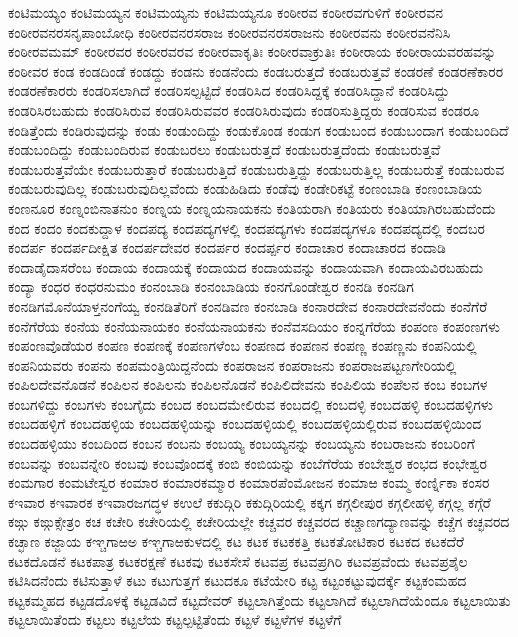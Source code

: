 {ಕಂಟಿಮಯ್ಯಂ
ಕಂಟಿಮಯ್ಯನ
ಕಂಟಿಮಯ್ಯನು
ಕಂಟಿಮಯ್ಯನೂ
ಕಂಠೀರವ
ಕಂಠೀರವಗುಳಿಗೆ
ಕಂಠೀರವನ
ಕಂಠೀರವನರಸನೃಪಾಂಬೋಧಿ
ಕಂಠೀರವನರಸರಾಜ
ಕಂಠೀರವನರಸರಾಜನು
ಕಂಠೀರವನು
ಕಂಠೀರವನೆನಿಸಿ
ಕಂಠೀರವಮಮ್
ಕಂಠೀರವರ
ಕಂಠೀರವರವ
ಕಂಠೀರವಾಕೃತಿಃ
ಕಂಠೀರವಾಕ್ರುತಿಃ
ಕಂಠೀರಾಯ
ಕಂಠೀರಾಯವರಹವನ್ನು
ಕಂಠೀವರ
ಕಂಡ
ಕಂಡದಿಂಡೆ
ಕಂಡದ್ದು
ಕಂಡನು
ಕಂಡನೆಂದು
ಕಂಡಬರುತ್ತದೆ
ಕಂಡಬರುತ್ತವೆ
ಕಂಡರಣೆ
ಕಂಡರಣೆಕಾರರ
ಕಂಡರಣೆಕಾರರು
ಕಂಡರಿಸಲಾಗಿದೆ
ಕಂಡರಿಸಲ್ಪಟ್ಟಿದೆ
ಕಂಡರಿಸಿದ
ಕಂಡರಿಸಿದ್ದಕ್ಕೆ
ಕಂಡರಿಸಿದ್ದಾನೆ
ಕಂಡರಿಸಿದ್ದು
ಕಂಡರಿಸಿರಬಹುದು
ಕಂಡರಿಸಿರುವ
ಕಂಡರಿಸಿರುವವರ
ಕಂಡರಿಸಿರುವುದು
ಕಂಡರಿಸುತ್ತಿದ್ದರು
ಕಂಡರಿಸುವ
ಕಂಡರೂ
ಕಂಡಿತ್ತೆಂದು
ಕಂಡಿರುವುದನ್ನು
ಕಂಡು
ಕಂಡುಂದಿದ್ದು
ಕಂಡುಕೊಂಡ
ಕಂಡುಗ
ಕಂಡುಬಂದ
ಕಂಡುಬಂದಾಗ
ಕಂಡುಬಂದಿದೆ
ಕಂಡುಬಂದಿದ್ದು
ಕಂಡುಬಂದಿರುವ
ಕಂಡುಬರಲು
ಕಂಡುಬರುತ್ತದೆ
ಕಂಡುಬರುತ್ತದೆಂದು
ಕಂಡುಬರುತ್ತವೆ
ಕಂಡುಬರುತ್ತವೆಯೇ
ಕಂಡುಬರುತ್ತಾರೆ
ಕಂಡುಬರುತ್ತಿದೆ
ಕಂಡುಬರುತ್ತಿದ್ದು
ಕಂಡುಬರುತ್ತಿಲ್ಲ
ಕಂಡುಬರುತ್ತೆ
ಕಂಡುಬರುವ
ಕಂಡುಬರುವುದಿಲ್ಲ
ಕಂಡುಬರುವುದಿಲ್ಲವೆಂದು
ಕಂಡುಹಿಡಿದು
ಕಂಡೆವು
ಕಂಡೇರಿಕಟ್ಟೆ
ಕಂಣಂಬಾಡಿ
ಕಂಣಂಬಾಡಿಯ
ಕಂಣನೂರ
ಕಂಣ್ನಂಬಿನಾತನುಂ
ಕಂಣ್ನಯ
ಕಂಣ್ನಯನಾಯಕನು
ಕಂತಿಯರಾಗಿ
ಕಂತಿಯರು
ಕಂತಿಯಾಗಿರಬಹುದೆಂದು
ಕಂದ
ಕಂದಂ
ಕಂದಕುದ್ದಾಳ
ಕಂದಪದ್ಯ
ಕಂದಪದ್ಯಗಳಲ್ಲಿ
ಕಂದಪದ್ಯಗಳು
ಕಂದಪದ್ಯಗಳೂ
ಕಂದಪದ್ಯದಲ್ಲಿ
ಕಂದಬರ
ಕಂದರ್ಪ
ಕಂದರ್ಪದೀಕ್ಷಿತ
ಕಂದರ್ಪದೇವರ
ಕಂದರ್ಪರ
ಕಂದರ್ಪ್ಪರ
ಕಂದಾಚಾರ
ಕಂದಾಚಾರದ
ಕಂದಾಡಿ
ಕಂದಾಡೈದಾಸರೆಂಬ
ಕಂದಾಯ
ಕಂದಾಯಕ್ಕೆ
ಕಂದಾಯದ
ಕಂದಾಯವನ್ನು
ಕಂದಾಯವಾಗಿ
ಕಂದಾಯವಿರಬಹುದು
ಕಂದ್ಯಾ
ಕಂಧರ
ಕಂಧರನುಮಂ
ಕಂನಂಬಾಡಿ
ಕಂನಂಬಾಡಿಯ
ಕಂನಗೊಂಡೇಶ್ವರ
ಕಂನಡಿ
ಕಂನಡಿಗ
ಕಂನಡಿಗಮೊನೆಯಾಳ್ತನಂಗೆಯ್ವ
ಕಂನಡಿತೆರಿಗೆ
ಕಂನಡಿವಣ
ಕಂನಬಾಡಿ
ಕಂನಾರದೇವ
ಕಂನಾರದೇವನೆಂದು
ಕಂನೆಗೆರೆ
ಕಂನೆಗೆರೆಯ
ಕಂನೆಯ
ಕಂನೆಯನಾಯಕಂ
ಕಂನೆಯನಾಯಕನು
ಕಂನೆವಸದಿಯಂ
ಕಂನ್ನಗೆರೆಯ
ಕಂಪಂಣ
ಕಂಪಂಣಗಳು
ಕಂಪಂಣವೊಡೆಯರ
ಕಂಪಣ
ಕಂಪಣಕ್ಕೆ
ಕಂಪಣಗಳೆಂಬ
ಕಂಪಣದ
ಕಂಪಣನ
ಕಂಪಣ್ಣ
ಕಂಪಣ್ಣನು
ಕಂಪನಿಯಲ್ಲಿ
ಕಂಪನಿಯವರು
ಕಂಪನು
ಕಂಪಮಂತ್ರಿಯಿದ್ದನೆಂದು
ಕಂಪರಾಜನ
ಕಂಪರಾಜನು
ಕಂಪರಾಜಪಟ್ಟಣಗೇರಿಯಲ್ಲಿ
ಕಂಪಿಲದೇವನೊಡನೆ
ಕಂಪಿಲನ
ಕಂಪಿಲನು
ಕಂಪಿಲನೊಡನೆ
ಕಂಪಿಲಿದೇವನು
ಕಂಪಿಲಿಯ
ಕಂಪೆಲನ
ಕಂಬ
ಕಂಬಗಳ
ಕಂಬಗಳಿದ್ದು
ಕಂಬಗಳು
ಕಂಬಗೈದು
ಕಂಬದ
ಕಂಬದಮೇಲಿರುವ
ಕಂಬದಲ್ಲಿ
ಕಂಬದಳ್ಳಿ
ಕಂಬದಹಳ್ಳಿ
ಕಂಬದಹಳ್ಳಿಗಳು
ಕಂಬದಹಳ್ಳಿಗೆ
ಕಂಬದಹಳ್ಳಿಯ
ಕಂಬದಹಳ್ಳಿಯನ್ನು
ಕಂಬದಹಳ್ಳಿಯಲ್ಲಿ
ಕಂಬದಹಳ್ಳಿಯಲ್ಲಿರುವ
ಕಂಬದಹಳ್ಳಿಯಿಂದ
ಕಂಬದಹಳ್ಳಿಯು
ಕಂಬದಿಂದ
ಕಂಬನ
ಕಂಬನು
ಕಂಬಯ್ಯ
ಕಂಬಯ್ಯನನ್ನು
ಕಂಬಯ್ಯನು
ಕಂಬರಾಜನು
ಕಂಬರಿಂಗೆ
ಕಂಬವನ್ನು
ಕಂಬವನ್ನೇರಿ
ಕಂಬವು
ಕಂಬವೊಂದಕ್ಕೆ
ಕಂಬಿ
ಕಂಬಿಯನ್ನು
ಕಂಬೆಗೆರೆಯ
ಕಂಬೇಶ್ವರ
ಕಂಭದ
ಕಂಭೇಶ್ವರ
ಕಂಮಗಾರ
ಕಂಮಟೇಸ್ವರ
ಕಂಮಾರ
ಕಂಮಾರಕಮ್ಮಾರ
ಕಂಮಾರಪೆಂಮೋಜನ
ಕಂಮಾಱ
ಕಂಮ್ಮ
ಕಂರ್ಣ್ನಿಕಾ
ಕಂಸರ
ಕಇವಾರ
ಕಇವಾರಕ
ಕಇವಾರಜಗದ್ಧಳ
ಕಉಲೆ
ಕಕುದ್ಗಿರಿ
ಕಕುದ್ಗಿರಿಯಲ್ಲಿ
ಕಕ್ಕಗ
ಕಗ್ಗಲೀಪುರ
ಕಗ್ಗಲೀಹಳ್ಳಿ
ಕಗ್ಗಲ್ಲ
ಕಗ್ಗೆರೆ
ಕಙ್ಗು
ಕಙ್ಗುಕ್ಸೇತ್ರಂ
ಕಚ
ಕಚೇರಿ
ಕಚೇರಿಯಲ್ಲಿ
ಕಚೇರಿಯಲ್ಲೇ
ಕಚ್ಚವರ
ಕಚ್ಚವರದ
ಕಚ್ಚಾಣಗದ್ಯಾಣವನ್ನು
ಕಚ್ಚೆಗ
ಕಚ್ಛವರದ
ಕಚ್ಛಾಣ
ಕಜ್ಜಾಯ
ಕಞ್ಚಗಾಱಅ
ಕಞ್ಚಗಾಱಕುಳದಲ್ಲಿ
ಕಟ
ಕಟಕ
ಕಟಕಕತ್ತಿ
ಕಟಕತೋಟಿಕಾರ
ಕಟಕದ
ಕಟಕದೆರೆ
ಕಟಕದೊಡನೆ
ಕಟಕಪಾತ್ರ
ಕಟಕರಕ್ಷಣೆ
ಕಟಕವು
ಕಟಕಸೇಸೆ
ಕಟವಪ್ರ
ಕಟವಪ್ರಗಿರಿ
ಕಟವಪ್ರವೆಂದು
ಕಟವಪ್ರಶೈಲ
ಕಟಿಸಿದನೆಂದು
ಕಟಿಸುತ್ತಾಳೆ
ಕಟು
ಕಟುಗುತ್ತಗೆ
ಕಟುದಕೂ
ಕಟೆಯೇರಿ
ಕಟ್ಟ
ಕಟ್ಟಂಕಟ್ಟುವುದರ್ಕ್ಕೆ
ಕಟ್ಟಕಂಮಹದ
ಕಟ್ಟಕಮ್ಮಹದ
ಕಟ್ಟಡದೊಳಕ್ಕೆ
ಕಟ್ಟಡವಿದೆ
ಕಟ್ಟದೇವರ್
ಕಟ್ಟಲಾಗಿತ್ತೆಂದು
ಕಟ್ಟಲಾಗಿದೆ
ಕಟ್ಟಲಾಗಿದೆಯೆಂದೂ
ಕಟ್ಟಲಾಯಿತು
ಕಟ್ಟಲಾಯಿತೆಂದು
ಕಟ್ಟಲು
ಕಟ್ಟಲೆಯ
ಕಟ್ಟಲ್ಪಟ್ಟಿತೆಂದು
ಕಟ್ಟಳೆ
ಕಟ್ಟಳೆಗಳ
ಕಟ್ಟಳೆಗೆ
}
